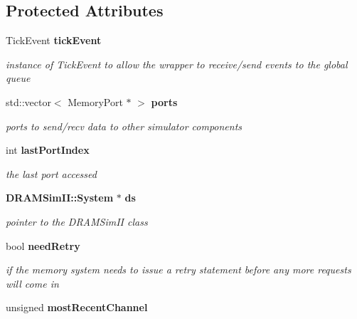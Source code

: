 \subsection*{Protected Attributes}
\begin{CompactItemize}
\item 
TickEvent {\bf tickEvent}\label{class_m5dram_system_2c1df40ac4ba1b6ee79a89c36717e6b5}

\begin{CompactList}\small\item\em instance of TickEvent to allow the wrapper to receive/send events to the global queue \item\end{CompactList}\item 
std::vector$<$ MemoryPort $\ast$ $>$ {\bf ports}\label{class_m5dram_system_c74ac86e7c7390068a33e60dfb352427}

\begin{CompactList}\small\item\em ports to send/recv data to other simulator components \item\end{CompactList}\item 
int {\bf lastPortIndex}\label{class_m5dram_system_8dec460f8036d2885f730687e207624c}

\begin{CompactList}\small\item\em the last port accessed \item\end{CompactList}\item 
{\bf DRAMSimII::System} $\ast$ {\bf ds}\label{class_m5dram_system_e4e67af7601cc345bc08d3de8475be65}

\begin{CompactList}\small\item\em pointer to the DRAMSimII class \item\end{CompactList}\item 
bool {\bf needRetry}\label{class_m5dram_system_b1c16d57a7d7a3a07c8c0250be821432}

\begin{CompactList}\small\item\em if the memory system needs to issue a retry statement before any more requests will come in \item\end{CompactList}\item 
unsigned {\bf mostRecentChannel}\label{class_m5dram_system_8f2613214d10b04b640bc26db979484b}


\end{CompactItemize}
